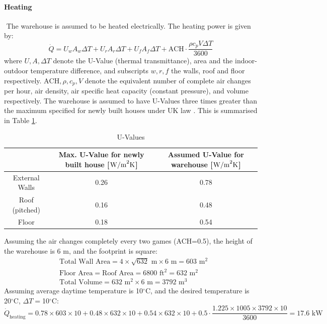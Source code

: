 \documentclass{report_template_oxford}
\begin{document}
\paragraph{Heating} \(\) \newline
The warehouse is assumed to be heated electrically. The heating power is given by:
\begin{equation}
    \dot Q=U_wA_w\Delta T+U_rA_r\Delta T+U_fA_f\Delta T +\text{ACH}\cdot \frac{\rho c_p V\Delta T}{3600}
\end{equation}
where \(U,A,\Delta T\) denote the U-Value (thermal transmittance), area and the indoor-outdoor temperature difference, and subscripts \(w,r,f\) the walls, roof and floor respectively. \(\text{ACH}, \rho, c_p, V\) denote the equivalent number of complete air changes per hour, air density, air specific heat capacity (constant pressure), and volume respectively. The warehouse is assumed to have U-Values three times greater than the maximum specified for newly built houses under UK law \cite{UValueRegs}. This is summarised in Table \ref{tab:U-Values}.
\begin{table}[h]
\centering
\caption{U-Values}
\begin{tabular}{|c|c|c|}
\hline
&Max. U-Value for newly built house [\(\text{W/m}^2\text K\)]& Assumed U-Value for warehouse [\(\text{W/m}^2\text K\)]\\
\hline
External Walls & 0.26 & 0.78 \\
Roof (pitched)& 0.16 & 0.48 \\
Floor & 0.18 & 0.54 \\
\hline
\end{tabular}
\label{tab:U-Values}
\end{table} \newline
\noindent Assuming the air changes completely every two games (ACH=0.5), the height of the warehouse is 6 m, and the footprint is square:
    \begin{align}
        &\text{Total Wall Area}=4 \times \sqrt{632}\text{ m} \times 6\text{ m}=603\text{ m}^2 \\
        &\text{Floor Area}=\text{Roof Area}=6800 \text{ ft}^2=632\text{ m}^2 \\
        &\text{Total Volume}=632\text{ m}^2 \times 6\text{ m}=3792\text{ m}^3
    \end{align}
\noindent Assuming average daytime temperature is 10\(^\circ\)C, and the desired temperature is 20\(^\circ\)C, \(\Delta T=\)10\(^\circ\)C:
\begin{equation}
\dot Q_\text{heating}=0.78\times603\times10+0.48\times632\times10+0.54\times632\times10+0.5\cdot \frac{1.225\times1005\times3792\times10}{3600}=17.6\text{ kW}
\end{equation}
\end{document}
